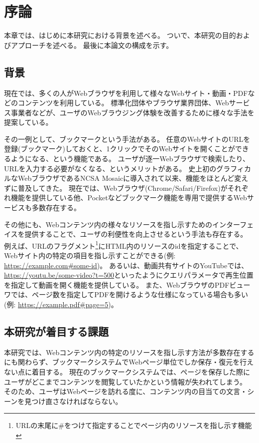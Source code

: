 \chapter{序論}
\label{chap:introduction}

本章では、はじめに本研究における背景を述べる。
ついで、本研究の目的およびアプローチを述べる。
最後に本論文の構成を示す。

\section{背景}
\label{section:background}

現在では、多くの人がWebブラウザを利用して様々なWebサイト・動画・PDFなどのコンテンツを利用している。
標準化団体やブラウザ業界団体、Webサービス事業者などが、ユーザのWebブラウジング体験を改善するために様々な手法を提案している。

その一例として、ブックマークという手法がある。
任意のWebサイトのURLを登録(ブックマーク)しておくと、1クリックでそのWebサイトを開くことができるようになる、という機能である。
ユーザが逐一Webブラウザで検索したり、URLを入力する必要がなくなる、というメリットがある。
史上初のグラフィカルなWebブラウザであるNCSA Mosaic\cite{ncsa-mosaic}に導入されて以来、機能をほとんど変えずに普及してきた。
現在では、Webブラウザ(Chrome\cite{chrome}/Safari\cite{safari}/Firefox\cite{firefox})がそれぞれ機能を提供している他、Pocket\cite{pocket}などブックマーク機能を専用で提供するWebサービスも多数存在する。

その他にも、Webコンテンツ内の様々なリソースを指し示すためのインターフェイスを提供することで、ユーザの利便性を向上させるという手法も存在する。
例えば、URLのフラグメント\footnote{URLの末尾に\#をつけて指定することでページ内のリソースを指し示す機能}にHTML内のリソースのidを指定することで、Webサイト内の特定の項目を指し示すことができる(例: \url{https://example.com#some-id})。
あるいは、動画共有サイトのYouTube\cite{youtube}では、\url{https://youtu.be/some-video?t=500}といったようにクエリパラメータで再生位置を指定して動画を開く機能を提供している。
また、WebブラウザのPDFビューワでは、ページ数を指定してPDFを開けるような仕様になっている場合も多い(例: \url{https://example.pdf#page=5})。

\section{本研究が着目する課題}
本研究では、Webコンテンツ内の特定のリソースを指し示す方法が多数存在するにも関わらず、ブックマークシステムでWebページ単位でしか保存・復元を行えない点に着目する。
現在のブックマークシステムでは、ページを保存した際にユーザがどこまでコンテンツを閲覧していたかという情報が失われてしまう。
そのため、ユーザはWebページを訪れる度に、コンテンツ内の目当ての文言・シーンを見つけ直さなければならない。

